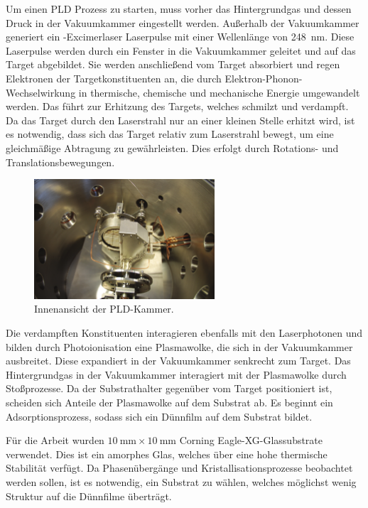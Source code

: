 Um einen PLD Prozess zu starten, muss vorher das Hintergrundgas und dessen Druck in der Vakuumkammer eingestellt werden.
Außerhalb der Vakuumkammer generiert ein -Excimerlaser Laserpulse mit einer Wellenlänge von
\qty{248}{\nano\meter}.
Diese Laserpulse werden durch ein Fenster in die Vakuumkammer geleitet und auf das Target abgebildet.
Sie werden anschließend vom Target absorbiert und regen Elektronen der Targetkonstituenten an, die durch
Elektron-Phonon-Wechselwirkung in thermische, chemische und mechanische Energie umgewandelt werden.
Das führt zur Erhitzung des Targets, welches schmilzt und verdampft.
Da das Target durch den Laserstrahl nur an einer kleinen Stelle erhitzt wird, ist es notwendig,
dass sich das Target relativ zum Laserstrahl bewegt, um eine gleichmäßige Abtragung zu gewährleisten.
Dies erfolgt durch Rotations- und Translationsbewegungen.

\begin{figure}
    \centering
    \includegraphics[width=0.6\textwidth]{../assets/messmethoden/pld/kammer}
    \caption{Innenansicht der PLD-Kammer. }
    \label{fig:pld_kammer}
\end{figure}

Die verdampften Konstituenten interagieren ebenfalls mit den Laserphotonen und bilden durch Photoionisation eine
Plasmawolke, die sich in der Vakuumkammer ausbreitet.
Diese expandiert in der Vakuumkammer senkrecht zum Target.
Das Hintergrundgas in der Vakuumkammer interagiert mit der Plasmawolke durch Stoßprozesse.
Da der Substrathalter gegenüber vom Target positioniert ist, scheiden sich Anteile der Plasmawolke auf dem
Substrat ab.
Es beginnt ein Adsorptionsprozess, sodass sich ein Dünnfilm auf dem Substrat bildet.

Für die Arbeit wurden $\qty{10}{\milli\meter} \times \qty{10}{\milli\meter}$ Corning Eagle-XG-Glassubstrate verwendet.
Dies ist ein amorphes Glas, welches über eine hohe thermische Stabilität verfügt.
Da Phasenübergänge und Kristallisationsprozesse beobachtet werden sollen, ist es notwendig, ein Substrat zu wählen,
welches möglichst wenig Struktur auf die Dünnfilme überträgt.
\newpage
